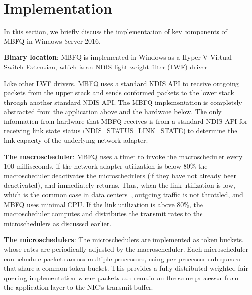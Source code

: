 \section{Implementation}
\label{sec:implementation}
In this section, we briefly discuss the implementation of key components of MBFQ in Windows
Server 2016.

{\bf Binary location}: MBFQ is implemented in Windows as a Hyper-V Virtual
Switch Extension, which is an NDIS light-weight filter (LWF) driver~\cite{fd}.

Like other LWF drivers, MBFQ uses a standard NDIS API to receive outgoing
packets from the upper stack and sends conformed packets to the lower stack
through another standard NDIS API.  The MBFQ implementation is completely abstracted
from the application above and the hardware below.  The only information from
hardware that MBFQ receives is from a standard NDIS API for receiving link state
status (NDIS\_STATUS\_LINK\_STATE) to determine the link capacity of the underlying 
network adapter.

{\bf The macroscheduler}: MBFQ uses a timer to invoke the macroscheduler every
100 milliseconds. if the network adapter utilization is below 80\% the
macroscheduler deactivates the microschedulers (if they have not already been
deactivated), and immediately returns.  Thus, when the link utilization is low,
which is the common case in data centers~\cite{fb,kandula09}, outgoing traffic
is not throttled, and MBFQ uses minimal CPU.  If the link utilization is above
80\%, the macroscheduler computes and distributes the transmit rates to the
microschedulers as discussed earlier.

{\bf The microschedulers}: The microschedulers are implemented as token buckets,
whose rates are periodically adjusted by the macroscheduler.  Each
microscheduler can schedule packets across multiple processors, using
per-processor sub-queues that share a common token bucket.  This provides a
fully distributed weighted fair queuing implementation where packets can remain
on the same processor from the application layer to the NIC's transmit buffer.


